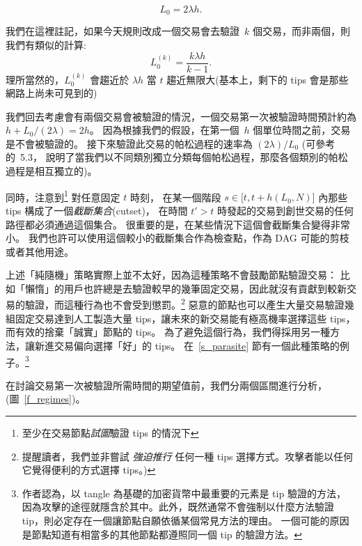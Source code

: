 \documentclass[12pt]{article}
\begin{document}
\begin{CJK}{UTF8}{bkai}
\begin{equation}
\label{L0_def} 
L_0 = 2\lambda h.
\end{equation}

我們在這裡註記，如果今天規則改成一個交易會去驗證~$k$ 個交易，而非兩個，則我們有類似的計算:
\begin{equation}
\label{L0k_def} 
 L_0^{(k)} = \frac{k\lambda h}{k-1}.
\end{equation}
理所當然的，$L^{(k)}_0$ 會趨近於 $\lambda h$ 當 $t$ 趨近無限大(基本上，剩下的 tips 會是那些網路上尚未可見到的)

我們回去考慮會有兩個交易會被驗證的情況，一個交易第一次被驗證時間預計約為 $h+L_0/(2\lambda)=2h$。
因為根據我們的假設，在第一個~$h$ 個單位時間之前，交易是不會被驗證的。
接下來驗證此交易的帕松過程的速率為 $(2\lambda)/L_0$ (可參考~\cite{Ross_m} 的~5.3，
說明了當我們以不同類別獨立分類每個帕松過程，那麼各個類別的帕松過程是相互獨立的)。

同時，注意到\footnote{至少在交易節點\emph{試圖}驗證 tips 的情況下} 對任意固定 $t$ 時刻， 
在某一個階段 $s\in\big[t,t+h(L_0,N)\big]$ 內那些 tips 構成了一個\emph{截斷集合}(cutset)，
在時間 $t'> t$ 時發起的交易到創世交易的任何路徑都必須通過這個集合。
很重要的是，在某些情況下這個會截斷集合變得非常小。
我們也許可以使用這個較小的截斷集合作為檢查點，作為 DAG 可能的剪枝或者其他用途。 

上述「純隨機」策略實際上並不太好，因為這種策略不會鼓勵節點驗證交易：
比如「懶惰」的用戶也許總是去驗證較早的幾筆固定交易，因此就沒有貢獻到較新交易的驗證，而這種行為也不會受到懲罰。\footnote{
提醒讀者，我們並非嘗試 \emph{強迫推行} 任何一種 tips 選擇方式。攻擊者能以任何它覺得便利的方式選擇 tips。)}
惡意的節點也可以產生大量交易驗證幾組固定交易達到人工製造大量 tips，讓未來的新交易能有極高機率選擇這些 tips，
而有效的捨棄「誠實」節點的 tips。
為了避免這個行為，我們得採用另一種方法，讓新進交易偏向選擇「好」的 tips。
在~\ref{s_parasite} 節有一個此種策略的例子。\footnote{作者認為，以 tangle 為基礎的加密貨幣中最重要的元素是 tip 驗證的方法，
因為攻擊的途徑就隱含於其中。此外，既然通常不會強制以什麼方法驗證 tip，則必定存在一個讓節點自願依循某個常見方法的理由。
一個可能的原因是節點知道有相當多的其他節點都遵照同一個 tip 的驗證方法。}

在討論交易第一次被驗證所需時間的期望值前，我們分兩個區間進行分析，(圖~\ref{f_regimes})。


\end{CJK}
\end{document}
